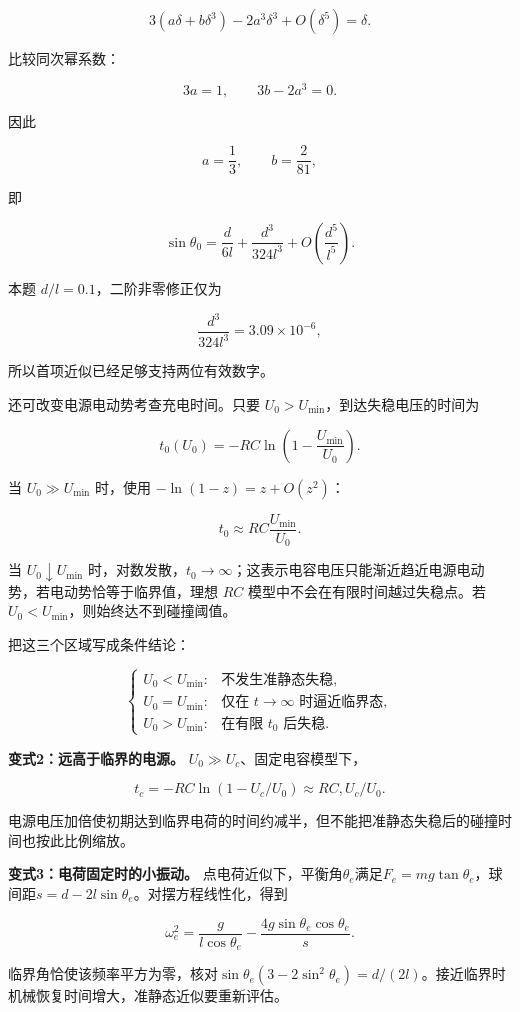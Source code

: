 \documentclass[12pt,a4paper,UTF8]{ctexart}
\begin{document}
\[
3(a\delta+b\delta^3)-2a^3\delta^3+O(\delta^5)=\delta.
\]

比较同次幂系数：

\[
3a=1,
\qquad
3b-2a^3=0.
\]

因此

\[
a=\frac13,
\qquad
b=\frac{2}{81},
\]

即

\[
\boxed{
\sin\theta_0
=\frac d{6l}
+\frac{d^3}{324l^3}
+O\!\left(\frac{d^5}{l^5}\right)
}.
\]

本题 \(d/l=0.1\)，二阶非零修正仅为

\[
\frac{d^3}{324l^3}=3.09\times10^{-6},
\]

所以首项近似已经足够支持两位有效数字。

还可改变电源电动势考查充电时间。只要
\(U_0>U_{\min}\)，到达失稳电压的时间为

\[
t_0(U_0)=-RC\ln\left(1-\frac{U_{\min}}{U_0}\right).
\]

当 \(U_0\gg U_{\min}\) 时，使用 \(-\ln(1-z)=z+O(z^2)\)：

\[
t_0\approx RC\frac{U_{\min}}{U_0}.
\]

当 \(U_0\downarrow U_{\min}\)
时，对数发散，\(t_0\to\infty\)；这表示电容电压只能渐近趋近电源电动势，若电动势恰等于临界值，理想
\(RC\) 模型中不会在有限时间越过失稳点。若
\(U_0<U_{\min}\)，则始终达不到碰撞阈值。

把这三个区域写成条件结论：

\[
\begin{cases}
U_0<U_{\min}:&\text{不发生准静态失稳},\\
U_0=U_{\min}:&\text{仅在 }t\to\infty\text{ 时逼近临界态},\\
U_0>U_{\min}:&\text{在有限 }t_0\text{ 后失稳}.
\end{cases}
\]

\textbf{变式2：远高于临界的电源。} \(U_0\gg U_c\)、固定电容模型下，

\[t_c=-RC\ln(1-U_c/U_0)\approx RC,U_c/U_0.\]

电源电压加倍使初期达到临界电荷的时间约减半，但不能把准静态失稳后的碰撞时间也按此比例缩放。

\textbf{变式3：电荷固定时的小振动。}
点电荷近似下，平衡角\(\theta_e\)满足\(F_e=mg\tan\theta_e\)，球间距\(s=d-2l\sin\theta_e\)。对摆方程线性化，得到

\[\omega_e^2=\frac g{l\cos\theta_e}-\frac{4g\sin\theta_e\cos\theta_e}{s}.\]

临界角恰使该频率平方为零，核对\(\sin\theta_e(3-2\sin^2\theta_e)=d/(2l)\)。接近临界时机械恢复时间增大，准静态近似要重新评估。
\end{document}
